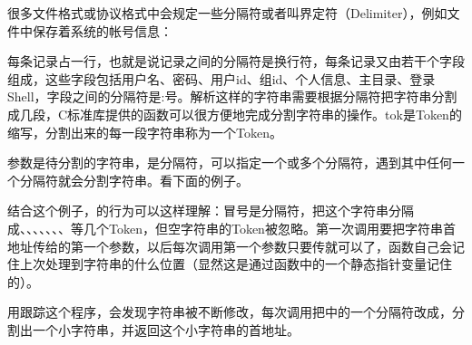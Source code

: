 很多文件格式或协议格式中会规定一些分隔符或者叫界定符（Delimiter），例如文件中保存着系统的帐号信息：




每条记录占一行，也就是说记录之间的分隔符是换行符，每条记录又由若干个字段组成，这些字段包括用户名、密码、用户id、组id、个人信息、主目录、登录Shell，字段之间的分隔符是:号。解析这样的字符串需要根据分隔符把字符串分割成几段，C标准库提供的函数可以很方便地完成分割字符串的操作。tok是Token的缩写，分割出来的每一段字符串称为一个Token。




参数是待分割的字符串，是分隔符，可以指定一个或多个分隔符，遇到其中任何一个分隔符就会分割字符串。看下面的例子。






结合这个例子，的行为可以这样理解：冒号是分隔符，把这个字符串分隔成、、\BookCode{\BookQuoteChar{}\BookQuoteChar{}}、\BookCode{\BookQuoteChar{}0\BookQuoteChar{}}、、、、\BookCode{\BookQuoteChar{}\BookQuoteChar{}}等几个Token，但空字符串的Token被忽略。第一次调用要把字符串首地址传给的第一个参数，以后每次调用第一个参数只要传就可以了，函数自己会记住上次处理到字符串的什么位置（显然这是通过函数中的一个静态指针变量记住的）。



用跟踪这个程序，会发现字符串被不断修改，每次调用把中的一个分隔符改成，分割出一个小字符串，并返回这个小字符串的首地址。




